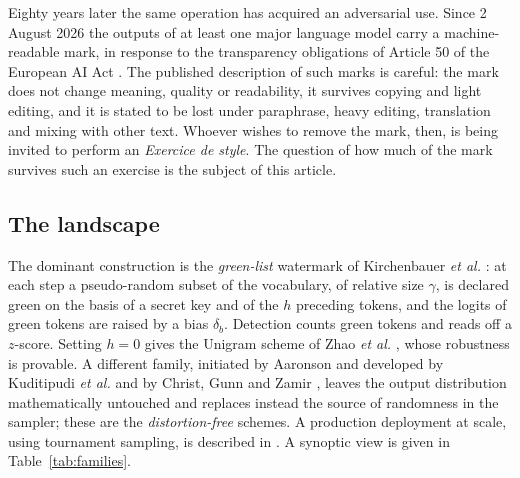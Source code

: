 \documentclass{article}
\theoremstyle{plain}
\theoremstyle{definition}
\numberwithin{equation}{section}
\begin{document}
Eighty years later the same operation has acquired an adversarial use.
Since 2 August 2026 the outputs of at least one major language model
carry a machine-readable mark, in response to the transparency
obligations of Article 50 of the European AI Act \cite{Anthropic26}. The
published description of such marks is careful: the mark does not change
meaning, quality or readability, it survives copying and light editing,
and it is stated to be lost under paraphrase, heavy editing, translation
and mixing with other text. Whoever wishes to remove the mark, then, is
being invited to perform an \emph{Exercice de style}. The question of
how much of the mark survives such an exercise is the subject of this
article.

\subsection*{The landscape}

The dominant construction is the \emph{green-list} watermark of
Kirchenbauer \emph{et al.} \cite{KGW23}: at each step a
pseudo-random subset of the vocabulary, of relative size $\gamma$, is
declared green on the basis of a secret key and of the $h$ preceding
tokens, and the logits of green tokens are raised by a bias $\delta_b$.
Detection counts green tokens and reads off a $z$-score. Setting $h=0$
gives the Unigram scheme of Zhao \emph{et al.} \cite{Zhao24}, whose
robustness is provable. A different family, initiated by Aaronson and
developed by Kuditipudi \emph{et al.} \cite{Kud24} and by Christ, Gunn
and Zamir \cite{CGZ24}, leaves the output distribution mathematically
untouched and replaces instead the source of randomness in the sampler;
these are the \emph{distortion-free} schemes. A production deployment at
scale, using tournament sampling, is described in \cite{Dath24}. A
synoptic view is given in Table~\ref{tab:families}.
\end{document}
